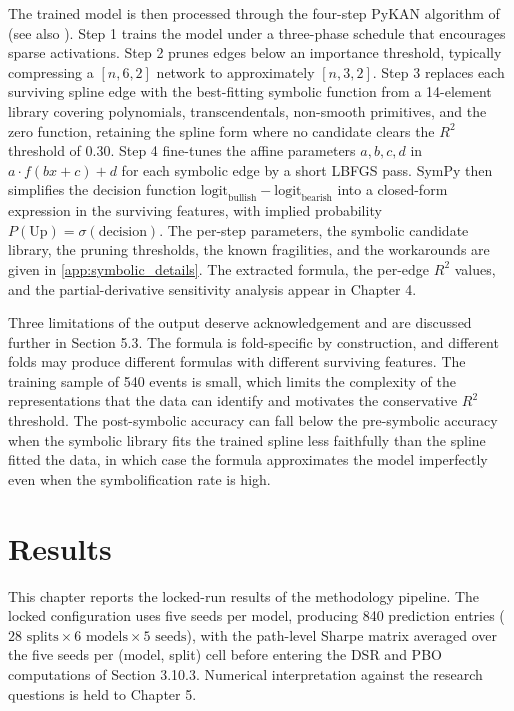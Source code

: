 \documentclass[12pt,a4paper,oneside]{article}
\begin{document}
The trained model is then processed through the four-step PyKAN algorithm of \citet{cho_lee_kim_2025} (see also \citet{noorizadegan_2026}). Step 1 trains the model under a three-phase schedule that encourages sparse activations. Step 2 prunes edges below an importance threshold, typically compressing a $[n, 6, 2]$ network to approximately $[n, 3, 2]$. Step 3 replaces each surviving spline edge with the best-fitting symbolic function from a 14-element library covering polynomials, transcendentals, non-smooth primitives, and the zero function, retaining the spline form where no candidate clears the $R^2$ threshold of 0.30. Step 4 fine-tunes the affine parameters $a, b, c, d$ in $a \cdot f(b x + c) + d$ for each symbolic edge by a short LBFGS pass. SymPy then simplifies the decision function $\text{logit}_{\text{bullish}} - \text{logit}_{\text{bearish}}$ into a closed-form expression in the surviving features, with implied probability $P(\text{Up}) = \sigma(\text{decision})$. The per-step parameters, the symbolic candidate library, the pruning thresholds, the known fragilities, and the workarounds are given in \label{ref:symbolic_appendix_call}\autoref{app:symbolic_details}. The extracted formula, the per-edge $R^2$ values, and the partial-derivative sensitivity analysis appear in Chapter 4.

Three limitations of the output deserve acknowledgement and are discussed further in Section 5.3. The formula is fold-specific by construction, and different folds may produce different formulas with different surviving features. The training sample of 540 events is small, which limits the complexity of the representations that the data can identify and motivates the conservative $R^2$ threshold. The post-symbolic accuracy can fall below the pre-symbolic accuracy when the symbolic library fits the trained spline less faithfully than the spline fitted the data, in which case the formula approximates the model imperfectly even when the symbolification rate is high.

\section{Results}\label{sec:results}

This chapter reports the locked-run results of the methodology pipeline. The locked configuration uses five seeds per model, producing 840 prediction entries ($28 \text{ splits} \times 6 \text{ models} \times 5 \text{ seeds}$), with the path-level Sharpe matrix averaged over the five seeds per (model, split) cell before entering the DSR and PBO computations of Section 3.10.3. Numerical interpretation against the research questions is held to Chapter 5.
\end{document}
